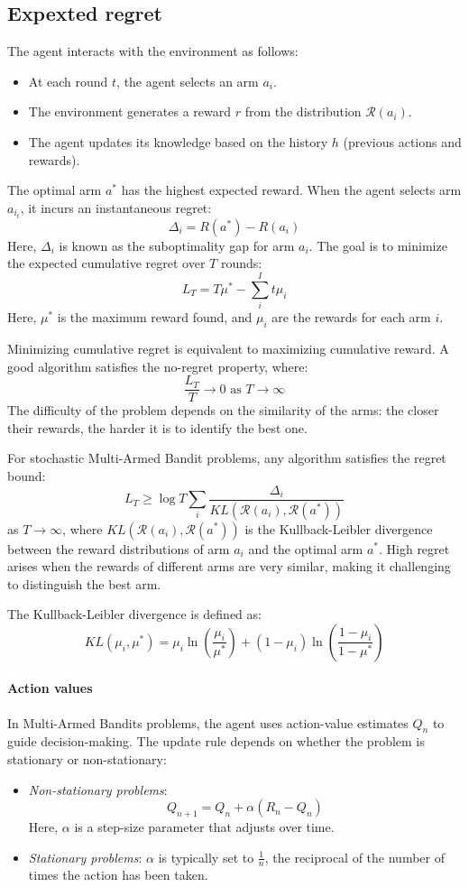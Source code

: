 \subsection{Expexted regret}
The agent interacts with the environment as follows:
\begin{itemize}
    \item At each round $ t $, the agent selects an arm $ a_{i} $.
    \item The environment generates a reward $ r $ from the distribution $ \mathcal{R}(a_{i}) $.
    \item The agent updates its knowledge based on the history $ h $ (previous actions and rewards).
\end{itemize}
The optimal arm $ a^\ast $ has the highest expected reward. 
When the agent selects arm $ a_{i_t} $, it incurs an instantaneous regret:
\[\Delta_{i}=R(a^\ast)-R(a_i)\]
Here, $ \Delta_i $ is known as the suboptimality gap for arm $ a_i $. 
The goal is to minimize the expected cumulative regret over $ T $ rounds:
\[L_T = T \mu^\ast - \sum_{i}^I t\mu_i\]
Here, $\mu^\ast$ is the maximum reward found, and $\mu_i$ are the rewards for each arm $i$. 

Minimizing cumulative regret is equivalent to maximizing cumulative reward. 
A good algorithm satisfies the no-regret property, where:
\[\frac{L_T}{T} \to 0  \text{ as } T \to \infty\]
The difficulty of the problem depends on the similarity of the arms: the closer their rewards, the harder it is to identify the best one.
\begin{theorem}
    For stochastic Multi-Armed Bandit problems, any algorithm satisfies the regret bound:
    \[L_T \geq \log T \sum_{i} \frac{\Delta_i}{KL(\mathcal{R}(a_i), \mathcal{R}(a^\ast))}\]
    as $ T \to \infty $, where $ KL(\mathcal{R}(a_i), \mathcal{R}(a^\ast)) $ is the Kullback-Leibler divergence between the reward distributions of arm $ a_i $ and the optimal arm $ a^\ast $. High regret arises when the rewards of different arms are very similar, making it challenging to distinguish the best arm.
\end{theorem}
The Kullback-Leibler divergence is defined as: 
\[KL(\mu_i, \mu^\ast)=\mu_i\ln\left(\dfrac{\mu_i}{\mu^\ast}\right)+(1-\mu_i)\ln\left(\dfrac{1-\mu_i}{1-\mu^\ast}\right)\]

\paragraph*{Action values}
In Multi-Armed Bandits problems, the agent uses action-value estimates $ Q_n $ to guide decision-making. The update rule depends on whether the problem is stationary or non-stationary:
\begin{itemize}
    \item \textit{Non-stationary problems}:
    \[Q_{n+1} = Q_n + \alpha \left(R_n - Q_n\right)\]
    Here, $ \alpha $ is a step-size parameter that adjusts over time.
    \item \textit{Stationary problems}: $ \alpha $ is typically set to $ \frac{1}{n} $, the reciprocal of the number of times the action has been taken.
\end{itemize}

